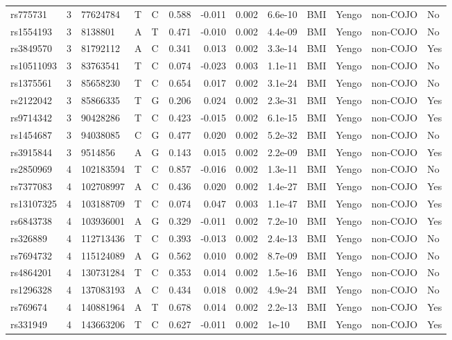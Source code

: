 \documentclass[11pt,twoside]{bristolthesis}
\begin{document}
\begin{longtable}[t]{lrlllrrrlllll}
rs775731 & 3 & 77624784 & T & C & 0.588 & -0.011 & 0.002 & 6.6e-10 & BMI & Yengo & non-COJO & No\\
\addlinespace
rs1554193 & 3 & 8138801 & A & T & 0.471 & -0.010 & 0.002 & 4.4e-09 & BMI & Yengo & non-COJO & No\\
rs3849570 & 3 & 81792112 & A & C & 0.341 & 0.013 & 0.002 & 3.3e-14 & BMI & Yengo & non-COJO & Yes\\
rs10511093 & 3 & 83763541 & T & C & 0.074 & -0.023 & 0.003 & 1.1e-11 & BMI & Yengo & non-COJO & No\\
rs1375561 & 3 & 85658230 & T & C & 0.654 & 0.017 & 0.002 & 3.1e-24 & BMI & Yengo & non-COJO & No\\
rs2122042 & 3 & 85866335 & T & G & 0.206 & 0.024 & 0.002 & 2.3e-31 & BMI & Yengo & non-COJO & Yes\\
\addlinespace
rs9714342 & 3 & 90428286 & T & C & 0.423 & -0.015 & 0.002 & 6.1e-15 & BMI & Yengo & non-COJO & Yes\\
rs1454687 & 3 & 94038085 & C & G & 0.477 & 0.020 & 0.002 & 5.2e-32 & BMI & Yengo & non-COJO & No\\
rs3915844 & 3 & 9514856 & A & G & 0.143 & 0.015 & 0.002 & 2.2e-09 & BMI & Yengo & non-COJO & Yes\\
rs2850969 & 4 & 102183594 & T & C & 0.857 & -0.016 & 0.002 & 1.3e-11 & BMI & Yengo & non-COJO & No\\
rs7377083 & 4 & 102708997 & A & C & 0.436 & 0.020 & 0.002 & 1.4e-27 & BMI & Yengo & non-COJO & Yes\\
\addlinespace
rs13107325 & 4 & 103188709 & T & C & 0.074 & 0.047 & 0.003 & 1.1e-47 & BMI & Yengo & non-COJO & Yes\\
rs6843738 & 4 & 103936001 & A & G & 0.329 & -0.011 & 0.002 & 7.2e-10 & BMI & Yengo & non-COJO & Yes\\
rs326889 & 4 & 112713436 & T & C & 0.393 & -0.013 & 0.002 & 2.4e-13 & BMI & Yengo & non-COJO & No\\
rs7694732 & 4 & 115124089 & A & G & 0.562 & 0.010 & 0.002 & 8.7e-09 & BMI & Yengo & non-COJO & No\\
rs4864201 & 4 & 130731284 & T & C & 0.353 & 0.014 & 0.002 & 1.5e-16 & BMI & Yengo & non-COJO & No\\
\addlinespace
rs1296328 & 4 & 137083193 & A & C & 0.434 & 0.018 & 0.002 & 4.9e-24 & BMI & Yengo & non-COJO & No\\
rs769674 & 4 & 140881964 & A & T & 0.678 & 0.014 & 0.002 & 2.2e-13 & BMI & Yengo & non-COJO & Yes\\
rs331949 & 4 & 143663206 & T & C & 0.627 & -0.011 & 0.002 & 1e-10 & BMI & Yengo & non-COJO & Yes\\

\end{longtable}
\end{document}

